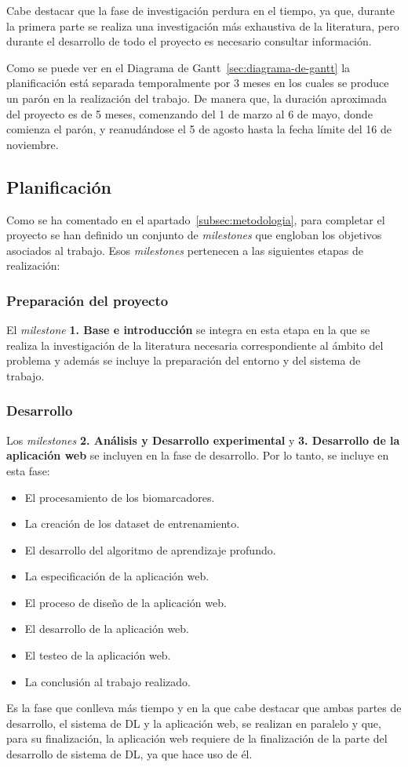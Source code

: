 Cabe destacar que la fase de investigación perdura en el tiempo, ya que, durante la primera parte se realiza una
investigación más exhaustiva de la literatura, pero durante el desarrollo de todo el proyecto es necesario consultar
información.

Como se puede ver en el Diagrama de Gantt~\ref{sec:diagrama-de-gantt} la planificación está separada temporalmente por
3 meses en los cuales se produce un parón en la realización del trabajo.
De manera que, la duración aproximada del proyecto es de 5 meses, comenzando del 1 de marzo al 6 de mayo, donde comienza
el parón, y reanudándose el 5 de agosto hasta la fecha límite del 16 de noviembre.

\subsection{Planificación}\label{subsec:planificacion}
Como se ha comentado en el apartado~\ref{subsec:metodologia}, para completar el proyecto se han definido un conjunto
de \textit{milestones} que engloban los objetivos asociados al trabajo.
Esos \textit{milestones} pertenecen a las siguientes etapas de realización:

\subsubsection{Preparación del proyecto}
El \textit{milestone} \textbf{1. Base e introducción} se integra en esta etapa en la que se realiza la investigación de
la literatura necesaria correspondiente al ámbito del problema y además se incluye la preparación del entorno y del
sistema de trabajo.

\subsubsection{Desarrollo}
Los \textit{milestones} \textbf{2. Análisis y Desarrollo experimental} y \textbf{3. Desarrollo de la aplicación web} se
incluyen en la fase de desarrollo.
Por lo tanto, se incluye en esta fase:

\begin{itemize}
    \item El procesamiento de los biomarcadores.
    \item La creación de los dataset de entrenamiento.
    \item El desarrollo del algoritmo de aprendizaje profundo.
    \item La especificación de la aplicación web.
    \item El proceso de diseño de la aplicación web.
    \item El desarrollo de la aplicación web.
    \item El testeo de la aplicación web.
    \item La conclusión al trabajo realizado. \\
\end{itemize}
Es la fase que conlleva más tiempo y en la que cabe destacar que ambas partes de desarrollo, el sistema de DL y la
aplicación web, se realizan en paralelo y que, para su finalización, la aplicación web requiere de la finalización de
la parte del desarrollo de sistema de DL, ya que hace uso de él.

